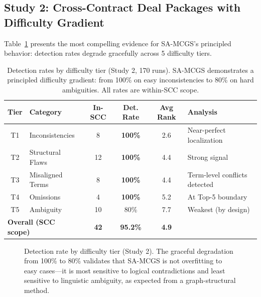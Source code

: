 \documentclass{article}
\begin{document}
\subsection{Study 2: Cross-Contract Deal Packages with Difficulty Gradient}

Table~\ref{tab:difficulty} presents the most compelling evidence for SA-MCGS's principled behavior: detection rates degrade gracefully across 5 difficulty tiers.

\begin{table}[t]
\caption{Detection rates by difficulty tier (Study 2, 170 runs). SA-MCGS demonstrates a principled difficulty gradient: from 100\% on easy inconsistencies to 80\% on hard ambiguities. All rates are within-SCC scope.}
\label{tab:difficulty}
\centering
\small
\begin{tabular}{clcccl}
\toprule
\textbf{Tier} & \textbf{Category} & \textbf{In-SCC} & \textbf{Det. Rate} & \textbf{Avg Rank} & \textbf{Analysis} \\
\midrule
T1 & Inconsistencies & 8 & \textbf{100\%} & 2.6 & Near-perfect localization \\
T2 & Structural Flaws & 12 & \textbf{100\%} & 4.4 & Strong signal \\
T3 & Misaligned Terms & 8 & \textbf{100\%} & 4.4 & Term-level conflicts detected \\
T4 & Omissions & 4 & \textbf{100\%} & 5.2 & At Top-5 boundary \\
T5 & Ambiguity & 10 & 80\% & 7.7 & Weakest (by design) \\
\midrule
\multicolumn{2}{l}{\textbf{Overall (SCC scope)}} & \textbf{42} & \textbf{95.2\%} & \textbf{4.9} & \\
\bottomrule
\end{tabular}
\end{table}

\begin{figure}[t]
    \centering
    \caption{Detection rate by difficulty tier (Study 2). The graceful degradation from 100\% to 80\% validates that SA-MCGS is not overfitting to easy cases---it is most sensitive to logical contradictions and least sensitive to linguistic ambiguity, as expected from a graph-structural method.}
    \label{fig:difficulty}
\end{figure}
\end{document}
